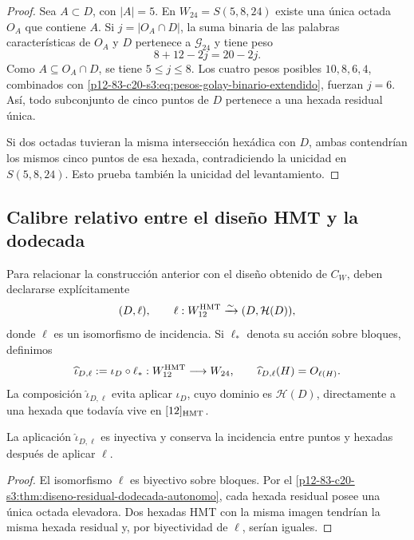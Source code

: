 \begin{proof}
Sea \(A\subset D\), con \(|A|=5\). En \(W_{24}=S(5,8,24)\) existe una
única octada \(O_A\) que contiene \(A\). Si \(j=|O_A\cap D|\), la suma
binaria de las palabras características de \(O_A\) y \(D\) pertenece a
\(\mathcal G_{24}\) y tiene peso
\[
 8+12-2j=20-2j.
\]
Como \(A\subseteq O_A\cap D\), se tiene \(5\leq j\leq8\). Los cuatro
pesos posibles \(10,8,6,4\), combinados con
\eqref{p12-83-c20-s3:eq:pesos-golay-binario-extendido}, fuerzan \(j=6\). Así, todo
subconjunto de cinco puntos de \(D\) pertenece a una hexada residual única.

Si dos octadas tuvieran la misma intersección hexádica con \(D\), ambas
contendrían los mismos cinco puntos de esa hexada, contradiciendo la
unicidad en \(S(5,8,24)\). Esto prueba también la unicidad del
levantamiento.
\end{proof}

\subsection{Calibre relativo entre el diseño HMT y la dodecada}

Para relacionar la construcción anterior con el diseño obtenido de
\(C_W\), deben declararse explícitamente
\begin{equation}
 (D,\ell),
 \qquad
 \ell:W_{12}^{\rm HMT}
 \xrightarrow{\sim}(D,\mathcal H(D)),
 \label{p12-83-c20-s3:eq:dato-relativo-dodecada-alineamiento}
\end{equation}
donde \(\ell\) es un isomorfismo de incidencia. Si \(\ell_*\) denota su
acción sobre bloques, definimos
\begin{equation}
 \widehat\iota_{D,\ell}
 :=\iota_D\circ\ell_*:
 W_{12}^{\rm HMT}\longrightarrow W_{24},
 \qquad
 \widehat\iota_{D,\ell}(H)=O_{\ell(H)}.
 \label{p12-83-c20-s3:eq:elevacion-tipificada-w12-w24}
\end{equation}
La composición \(\widehat\iota_{D,\ell}\) evita aplicar
\(\iota_D\), cuyo dominio es \(\mathcal H(D)\), directamente a una hexada
que todavía vive en \([12]_{\rm HMT}\).

\begin{proposition}
\label{p12-83-c20-s3:prop:inyectividad-elevacion-w12-w24}
La aplicación \(\widehat\iota_{D,\ell}\) es inyectiva y conserva la
incidencia entre puntos y hexadas después de aplicar \(\ell\).
\end{proposition}

\begin{proof}
El isomorfismo \(\ell\) es biyectivo sobre bloques. Por el
\cref{p12-83-c20-s3:thm:diseno-residual-dodecada-autonomo}, cada hexada residual posee una
única octada elevadora. Dos hexadas HMT con la misma imagen tendrían la misma
hexada residual y, por biyectividad de \(\ell\), serían iguales.
\end{proof}

